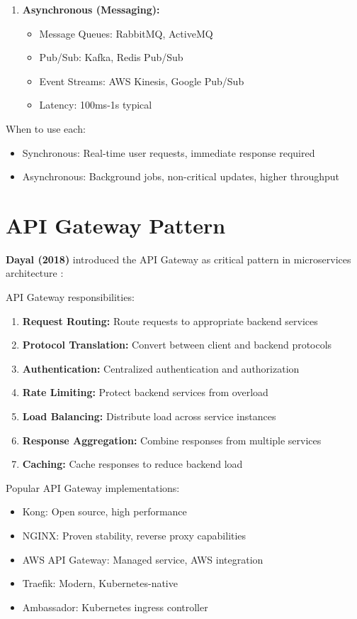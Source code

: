 \documentclass[conference]{IEEEtran}
\begin{document}
\begin{enumerate}
\begin{enumerate}
    \item \textbf{Asynchronous (Messaging):}
    \begin{itemize}
        \item Message Queues: RabbitMQ, ActiveMQ
        \item Pub/Sub: Kafka, Redis Pub/Sub
        \item Event Streams: AWS Kinesis, Google Pub/Sub
        \item Latency: 100ms-1s typical
    \end{itemize}
\end{enumerate}

When to use each:
\begin{itemize}
    \item Synchronous: Real-time user requests, immediate response required
    \item Asynchronous: Background jobs, non-critical updates, higher throughput
\end{itemize}

\section{API Gateway Pattern}

\textbf{Dayal (2018)} introduced the API Gateway as critical pattern in microservices architecture \cite{dayal2018api}:

API Gateway responsibilities:
\begin{enumerate}
    \item \textbf{Request Routing:} Route requests to appropriate backend services
    \item \textbf{Protocol Translation:} Convert between client and backend protocols
    \item \textbf{Authentication:} Centralized authentication and authorization
    \item \textbf{Rate Limiting:} Protect backend services from overload
    \item \textbf{Load Balancing:} Distribute load across service instances
    \item \textbf{Response Aggregation:} Combine responses from multiple services
    \item \textbf{Caching:} Cache responses to reduce backend load
\end{enumerate}

Popular API Gateway implementations:
\begin{itemize}
    \item Kong: Open source, high performance
    \item NGINX: Proven stability, reverse proxy capabilities
    \item AWS API Gateway: Managed service, AWS integration
    \item Traefik: Modern, Kubernetes-native
    \item Ambassador: Kubernetes ingress controller
\end{itemize}


\end{enumerate}
\end{document}
